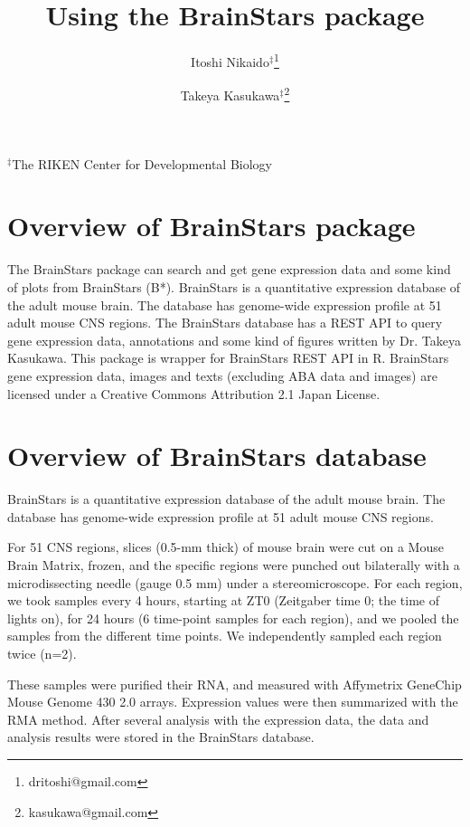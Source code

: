 \documentclass[12pt,fullpage]{article}
\author{Itoshi Nikaido$^\ddagger$\footnote{dritoshi@gmail.com} \and Takeya Kasukawa$^\ddagger$\footnote{kasukawa@gmail.com}}
\begin{document}
\title{Using the BrainStars package}
\maketitle
\begin{center}$^\ddagger$The RIKEN Center for Developmental Biology
\end{center}

\tableofcontents

\section{Overview of BrainStars package}
The BrainStars package can search and get gene expression data
and some kind of plots from BrainStars (B*). BrainStars is a 
quantitative expression database of the adult mouse brain. 
The database has genome-wide expression profile at 51 adult mouse 
CNS regions.  The BrainStars database has a REST API to query gene 
expression data, annotations and some kind of figures written by 
Dr. Takeya Kasukawa.  This package is wrapper for BrainStars REST 
API in R. BrainStars gene expression data, images and texts 
(excluding ABA data and images) are licensed under a Creative 
Commons Attribution 2.1 Japan License.

\section{Overview of BrainStars database}
BrainStars is a quantitative expression database of the adult
mouse brain. The database has genome-wide expression profile at 51
adult mouse CNS regions.

For 51 CNS regions, slices (0.5-mm thick) of mouse brain were cut on a
Mouse Brain Matrix, frozen, and the specific regions were punched out
bilaterally with a microdissecting needle (gauge 0.5 mm) under a
stereomicroscope. For each region, we took samples every 4 hours,
starting at ZT0 (Zeitgaber time 0; the time of lights on), for 24
hours (6 time-point samples for each region), and we pooled the
samples from the different time points. We independently sampled each
region twice (n=2).

These samples were purified their RNA, and measured with Affymetrix
GeneChip Mouse Genome 430 2.0 arrays. Expression values were then
summarized with the RMA method. After several analysis with the
expression data, the data and analysis results were stored in the
BrainStars database.
  
\end{document}
